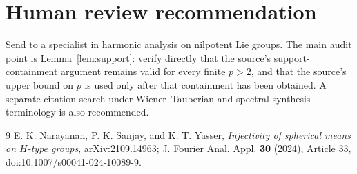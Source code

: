 \documentclass[11pt]{article}
\begin{document}
\section{Human review recommendation}

Send to a specialist in harmonic analysis on nilpotent Lie groups.  The main
audit point is Lemma~\ref{lem:support}: verify directly that the source's
support-containment argument remains valid for every finite $p>2$, and that
the source's upper bound on $p$ is used only after that containment has been
obtained.  A separate citation search under Wiener--Tauberian and spectral
synthesis terminology is also recommended.

\begin{thebibliography}{9}
E. K. Narayanan, P. K. Sanjay, and K. T. Yasser,
\emph{Injectivity of spherical means on $H$-type groups},
arXiv:2109.14963; J. Fourier Anal. Appl. \textbf{30} (2024), Article 33,
doi:10.1007/s00041-024-10089-9.
\end{thebibliography}
\end{document}
